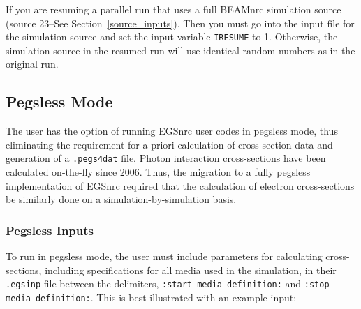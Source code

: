 \documentclass[12pt,twoside]{article}  %
\begin{document}
If you are resuming a parallel run that uses a full BEAMnrc simulation
source (source 23--See Section~\ref{source_inputs}).  Then you must go
into the input file for the simulation source and set the input variable
{\tt IRESUME} to 1.  Otherwise, the simulation source in the resumed run
will use identical random numbers as in the original run.

\subsection{Pegsless Mode}
The user has the option of running EGSnrc user codes in pegsless
mode, thus eliminating the requirement for a-priori calculation of cross-section data and generation
of a {\tt .pegs4dat} file.  Photon interaction cross-sections have been calculated on-the-fly since
2006.  Thus, the migration to a fully pegsless implementation of EGSnrc required that
the calculation of electron cross-sections be similarly done on a simulation-by-simulation
basis.

\subsubsection{Pegsless Inputs}

To run in pegsless mode, the user must include parameters for calculating cross-sections, including
specifications for all media used in the simulation, in their {\tt .egsinp} file between the
delimiters, {\tt :start media definition:} and {\tt :stop media definition:}.  This is best illustrated
with an example input:
\end{document}
